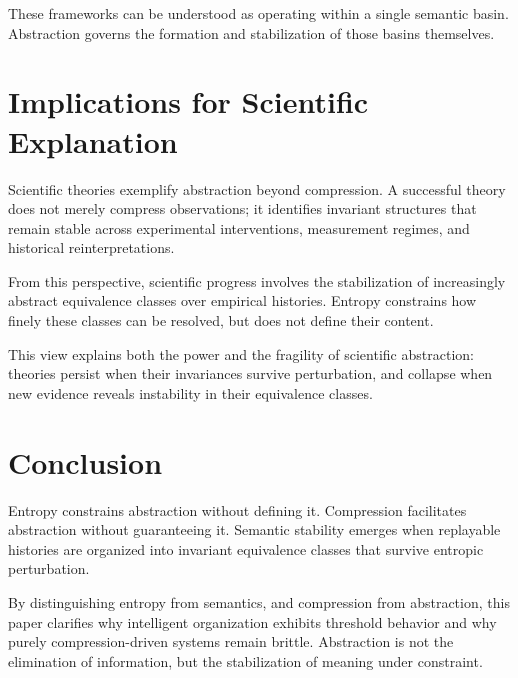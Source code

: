 \documentclass[11pt]{article}
\begin{document}
These frameworks can be understood as operating within a single semantic basin. Abstraction governs the formation and stabilization of those basins themselves.

\section{Implications for Scientific Explanation}

Scientific theories exemplify abstraction beyond compression. A successful theory does not merely compress observations; it identifies invariant structures that remain stable across experimental interventions, measurement regimes, and historical reinterpretations.

From this perspective, scientific progress involves the stabilization of increasingly abstract equivalence classes over empirical histories. Entropy constrains how finely these classes can be resolved, but does not define their content.

This view explains both the power and the fragility of scientific abstraction: theories persist when their invariances survive perturbation, and collapse when new evidence reveals instability in their equivalence classes.

\section{Conclusion}

Entropy constrains abstraction without defining it. Compression facilitates abstraction without guaranteeing it. Semantic stability emerges when replayable histories are organized into invariant equivalence classes that survive entropic perturbation.

By distinguishing entropy from semantics, and compression from abstraction, this paper clarifies why intelligent organization exhibits threshold behavior and why purely compression-driven systems remain brittle. Abstraction is not the elimination of information, but the stabilization of meaning under constraint.
\end{document}
